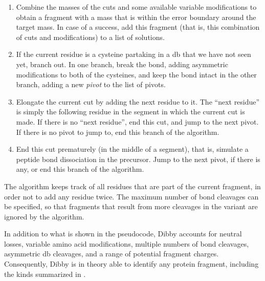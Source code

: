 \begin{enumerate}
  \item Combine the masses of the  cuts and some available variable modifications to obtain a fragment with a mass that is within the error boundary around the target mass. In case of a success, add this fragment (that is, this combination of cuts and modifications) to a list of solutions.
  \item If the current residue is a cysteine partaking in a \gls*{db} that we have not seen yet, branch out. In one branch, break the bond, adding asymmetric modifications to both of the cysteines, and keep the bond intact in the other branch, adding a new \emph{pivot} to the list of pivots.
  \item Elongate the current cut by adding the next residue to it. The ``next residue'' is simply the following residue in the segment in which the current cut is made. If there is no ``next residue'', end this cut, and jump to the next pivot. If there is no pivot to jump to, end this branch of the algorithm.
  \item End this cut prematurely (in the middle of a segment), that is, simulate a peptide bond dissociation in the precursor. Jump to the next pivot, if there is any, or end this branch of the algorithm.
\end{enumerate}

The algorithm keeps track of all residues that are part of the current fragment, in order not to add any residue twice. The maximum number of bond cleavages can be specified, so that fragments that result from more cleavages in the variant are ignored by the algorithm.

In addition to what is shown in the pseudocode, Dibby accounts for neutral losses, variable amino acid modifications, multiple numbers of bond cleavages, asymmetric \gls*{db} cleavages, and a range of potential fragment charges. Consequently, Dibby is in theory able to identify any protein fragment, including the kinds summarized in .

